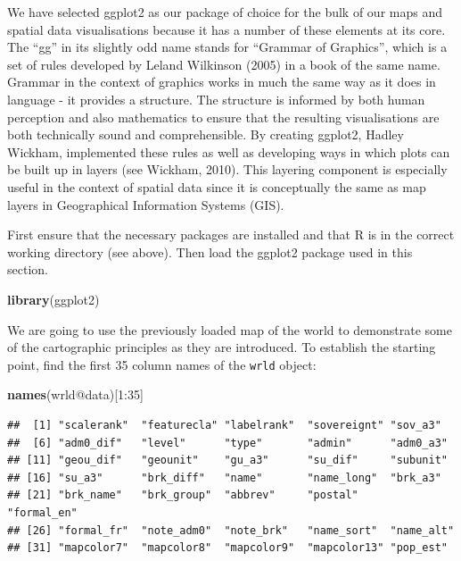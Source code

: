 \documentclass[]{article}
\newenvironment{Shaded}{}{}
\newcommand{\KeywordTok}[1]{\textcolor[rgb]{0.00,0.44,0.13}{\textbf{{#1}}}}
\newcommand{\DecValTok}[1]{\textcolor[rgb]{0.25,0.63,0.44}{{#1}}}
\newcommand{\NormalTok}[1]{{#1}}
\begin{document}
We have selected ggplot2 as our package of choice for the bulk of our
maps and spatial data visualisations because it has a number of these
elements at its core. The ``gg'' in its slightly odd name stands for
``Grammar of Graphics'', which is a set of rules developed by Leland
Wilkinson (2005) in a book of the same name. Grammar in the context of
graphics works in much the same way as it does in language - it provides
a structure. The structure is informed by both human perception and also
mathematics to ensure that the resulting visualisations are both
technically sound and comprehensible. By creating ggplot2, Hadley
Wickham, implemented these rules as well as developing ways in which
plots can be built up in layers (see Wickham, 2010). This layering
component is especially useful in the context of spatial data since it
is conceptually the same as map layers in Geographical Information
Systems (GIS).

First ensure that the necessary packages are installed and that R is in
the correct working directory (see above). Then load the ggplot2 package
used in this section.

\begin{Shaded}
\begin{Highlighting}[]
\KeywordTok{library}\NormalTok{(ggplot2)}
\end{Highlighting}
\end{Shaded}

We are going to use the previously loaded map of the world to
demonstrate some of the cartographic principles as they are introduced.
To establish the starting point, find the first 35 column names of the
\texttt{wrld} object:

\begin{Shaded}
\begin{Highlighting}[]
\KeywordTok{names}\NormalTok{(wrld@data)[}\DecValTok{1}\NormalTok{:}\DecValTok{35}\NormalTok{]}
\end{Highlighting}
\end{Shaded}

\begin{verbatim}
##  [1] "scalerank"  "featurecla" "labelrank"  "sovereignt" "sov_a3"    
##  [6] "adm0_dif"   "level"      "type"       "admin"      "adm0_a3"   
## [11] "geou_dif"   "geounit"    "gu_a3"      "su_dif"     "subunit"   
## [16] "su_a3"      "brk_diff"   "name"       "name_long"  "brk_a3"    
## [21] "brk_name"   "brk_group"  "abbrev"     "postal"     "formal_en" 
## [26] "formal_fr"  "note_adm0"  "note_brk"   "name_sort"  "name_alt"  
## [31] "mapcolor7"  "mapcolor8"  "mapcolor9"  "mapcolor13" "pop_est"
\end{verbatim}
\end{document}
